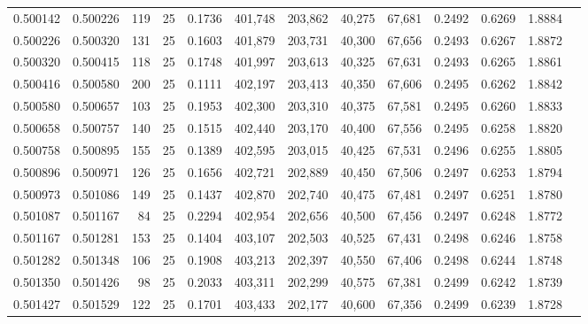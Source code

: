 \begin{tabular}{rrrrrrrrrrrrr}
0.500142 & 0.500226 &   119 &  25 &                                     0.1736 & 401,748 & 203,862 &  40,275 &  67,681 & 0.2492 & 0.6269 & 1.8884 \\
0.500226 & 0.500320 &   131 &  25 &                                     0.1603 & 401,879 & 203,731 &  40,300 &  67,656 & 0.2493 & 0.6267 & 1.8872 \\
0.500320 & 0.500415 &   118 &  25 &                                     0.1748 & 401,997 & 203,613 &  40,325 &  67,631 & 0.2493 & 0.6265 & 1.8861 \\
0.500416 & 0.500580 &   200 &  25 &                                     0.1111 & 402,197 & 203,413 &  40,350 &  67,606 & 0.2495 & 0.6262 & 1.8842 \\
0.500580 & 0.500657 &   103 &  25 &                                     0.1953 & 402,300 & 203,310 &  40,375 &  67,581 & 0.2495 & 0.6260 & 1.8833 \\
0.500658 & 0.500757 &   140 &  25 &                                     0.1515 & 402,440 & 203,170 &  40,400 &  67,556 & 0.2495 & 0.6258 & 1.8820 \\
0.500758 & 0.500895 &   155 &  25 &                                     0.1389 & 402,595 & 203,015 &  40,425 &  67,531 & 0.2496 & 0.6255 & 1.8805 \\
0.500896 & 0.500971 &   126 &  25 &                                     0.1656 & 402,721 & 202,889 &  40,450 &  67,506 & 0.2497 & 0.6253 & 1.8794 \\
0.500973 & 0.501086 &   149 &  25 &                                     0.1437 & 402,870 & 202,740 &  40,475 &  67,481 & 0.2497 & 0.6251 & 1.8780 \\
0.501087 & 0.501167 &    84 &  25 &                                     0.2294 & 402,954 & 202,656 &  40,500 &  67,456 & 0.2497 & 0.6248 & 1.8772 \\
0.501167 & 0.501281 &   153 &  25 &                                     0.1404 & 403,107 & 202,503 &  40,525 &  67,431 & 0.2498 & 0.6246 & 1.8758 \\
0.501282 & 0.501348 &   106 &  25 &                                     0.1908 & 403,213 & 202,397 &  40,550 &  67,406 & 0.2498 & 0.6244 & 1.8748 \\
0.501350 & 0.501426 &    98 &  25 &                                     0.2033 & 403,311 & 202,299 &  40,575 &  67,381 & 0.2499 & 0.6242 & 1.8739 \\
0.501427 & 0.501529 &   122 &  25 &                                     0.1701 & 403,433 & 202,177 &  40,600 &  67,356 & 0.2499 & 0.6239 & 1.8728 \\

\end{tabular}
